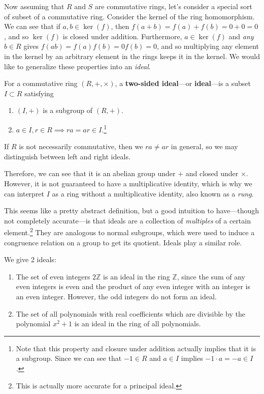   Now assuming that $R$ and $S$ are commutative rings, let's consider a special sort of subset of a commutative ring. Consider the kernel of the ring homomorphism. We can see that if $a, b \in \ker(f)$, then $f(a + b) = f(a) + f(b) = 0 + 0 = 0$, and so $\ker(f)$ is closed under addition. Furthermore, $a \in \ker(f)$ and \textit{any} $b \in R$ gives $f(ab) = f(a) f(b) = 0 f(b) = 0$, and so multiplying any element in the kernel by an arbitrary element in the rings keeps it in the kernel. We would like to generalize these properties into an \textit{ideal}. 

  \begin{definition}[Ideals]
    For a commutative ring $(R,+, \times)$, a \textbf{two-sided ideal}---or \textbf{ideal}---is a subset $I \subset R$ satisfying 
    \begin{enumerate}
      \item $(I, +)$ is a subgroup of $(R, +)$. 
      \item $a \in I, r \in R \implies ra = ar \in I$.\footnote{Note that this property and closure under addition actually implies that it is a subgroup. Since we can see that $-1 \in R$ and $a \in I$ implies $-1 \cdot a = -a \in I$.}
    \end{enumerate}
    If $R$ is not necessarily commutative, then we $ra \neq ar$ in general, so we may distinguish between left and right ideals. 
  \end{definition}

  Therefore, we can see that it is an abelian group under $+$ and closed under $\times$. However, it is not guaranteed to have a multiplicative identity, which is why we can interpret $I$ as a ring without a multiplicative identity, also known as a \textit{rung}. 

  This seems like a pretty abstract definition, but a good intuition to have---though not completely accurate---is that ideals are a collection of \textit{multiples} of a certain element.\footnote{This is actually more accurate for a principal ideal.} They are analogous to normal subgroups, which were used to induce a congruence relation on a group to get its quotient. Ideals play a similar role. 

  \begin{example}
    We give 2 ideals: 
    \begin{enumerate}
      \item The set of even integers $2 \mathbb{Z}$ is an ideal in the ring $\mathbb{Z}$, since the sum of any even integers is even and the product of any even integer with an integer is an even integer. However, the odd integers do not form an ideal. 
      \item The set of all polynomials with real coefficients which are divisible by the polynomial $x^2 + 1$ is an ideal in the ring of all polynomials. 
    \end{enumerate}
  \end{example}

